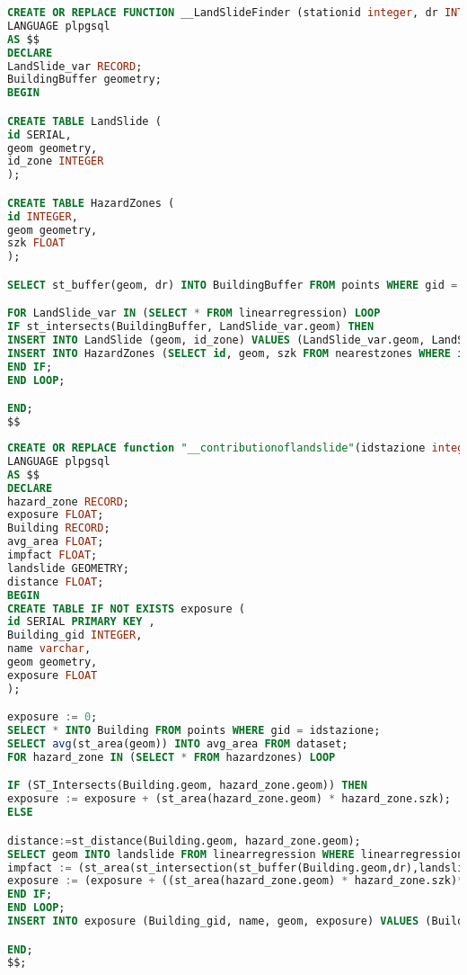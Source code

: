 \begin{lstlisting}[language=SQL]
CREATE OR REPLACE FUNCTION __LandSlideFinder (stationid integer, dr INTEGER) RETURNS void
LANGUAGE plpgsql
AS $$
DECLARE
LandSlide_var RECORD;
BuildingBuffer geometry;
BEGIN

CREATE TABLE LandSlide (
id SERIAL,
geom geometry,
id_zone INTEGER
);

CREATE TABLE HazardZones (
id INTEGER,
geom geometry,
szk FLOAT
);

SELECT st_buffer(geom, dr) INTO BuildingBuffer FROM points WHERE gid = stationid;

FOR LandSlide_var IN (SELECT * FROM linearregression) LOOP
IF st_intersects(BuildingBuffer, LandSlide_var.geom) THEN
INSERT INTO LandSlide (geom, id_zone) VALUES (LandSlide_var.geom, LandSlide_var.id_zone);
INSERT INTO HazardZones (SELECT id, geom, szk FROM nearestzones WHERE id = LandSlide_var.id_zone);
END IF;
END LOOP;

END;
$$
\end{lstlisting}

\begin{lstlisting}[language=SQL]
CREATE OR REPLACE function "__contributionoflandslide"(idstazione integer, dr double precision) returns void
LANGUAGE plpgsql
AS $$
DECLARE
hazard_zone RECORD;
exposure FLOAT;
Building RECORD;
avg_area FLOAT;
impfact FLOAT;
landslide GEOMETRY;
distance FLOAT;
BEGIN
CREATE TABLE IF NOT EXISTS exposure (
id SERIAL PRIMARY KEY ,
Building_gid INTEGER,
name varchar,
geom geometry,
exposure FLOAT
);

exposure := 0;
SELECT * INTO Building FROM points WHERE gid = idstazione;
SELECT avg(st_area(geom)) INTO avg_area FROM dataset;
FOR hazard_zone IN (SELECT * FROM hazardzones) LOOP

IF (ST_Intersects(Building.geom, hazard_zone.geom)) THEN
exposure := exposure + (st_area(hazard_zone.geom) * hazard_zone.szk);
ELSE

distance:=st_distance(Building.geom, hazard_zone.geom);
SELECT geom INTO landslide FROM linearregression WHERE linearregression.id_zone = hazard_zone.id;
impfact := (st_area(st_intersection(st_buffer(Building.geom,dr),landslide)))/(st_area(st_buffer(Building.geom,dr)));
exposure := (exposure + ((st_area(hazard_zone.geom) * hazard_zone.szk)*impfact));
END IF;
END LOOP;
INSERT INTO exposure (Building_gid, name, geom, exposure) VALUES (Building.gid, Building.name, Building.geom, exposure/avg_area);

END;
$$;
\end{lstlisting}